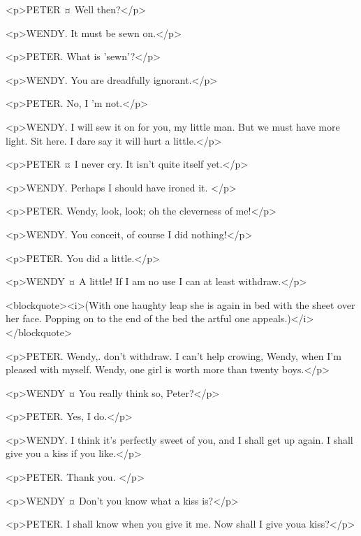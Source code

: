 <p>PETER ¤
Well then?</p>

<p>WENDY. It must be sewn on.</p>

<p>PETER. What is 'sewn'?</p>

<p>WENDY. You are dreadfully ignorant.</p>

<p>PETER. No, I 'm not.</p>

<p>WENDY. I will sew it on for you, my little man. But we must have more light.
Sit here. I dare say it will hurt a little.</p>

<p>PETER ¤
I never cry.
It isn't quite itself yet.</p>

<p>WENDY. Perhaps I should have ironed it.
</p>

<p>PETER. Wendy, look, look; oh the cleverness of me!</p>

<p>WENDY. You conceit, of course I did nothing!</p>

<p>PETER. You did a little.</p>

<p>WENDY ¤
A little! If I am no use I can at least withdraw.</p>

<blockquote><i>(With one haughty leap she is again in bed with the sheet over her face. Popping on to the end of the bed the artful one appeals.)</i></blockquote>

<p>PETER. Wendy,. don't withdraw. I can't help crowing, Wendy, when I'm pleased with myself. Wendy, one girl is worth more than twenty boys.</p>

<p>WENDY ¤
You really think so, Peter?</p>

<p>PETER. Yes, I do.</p>

<p>WENDY. I think it's perfectly sweet of you, and I shall get up again.
I shall give you a kiss if you like.</p>

<p>PETER. Thank you.
</p>

<p>WENDY ¤
Don't you know what a kiss is?</p>

<p>PETER. I shall know when you give it me.
Now shall I give youa kiss?</p>

